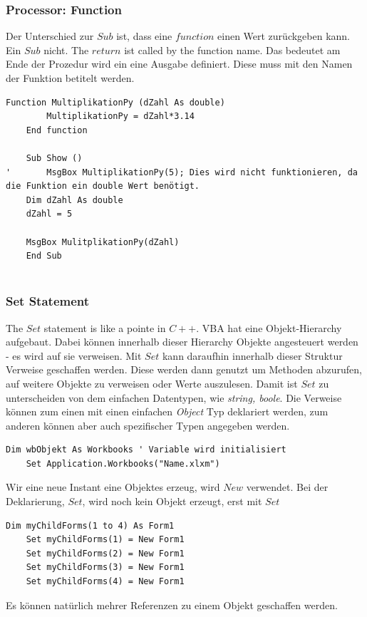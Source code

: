 \subsubsection{Processor: Function}
Der Unterschied zur $Sub$ ist, dass eine $function$ einen Wert zurückgeben kann. Ein $Sub$ nicht.
The $return$ ist called by the function name. Das bedeutet am Ende der Prozedur wird ein eine Ausgabe definiert. Diese muss mit den Namen der Funktion betitelt werden.

\begin{lstlisting}[style=VBA]
	Function MultiplikationPy (dZahl As double)
		MultiplikationPy = dZahl*3.14
	End function
	
	Sub Show ()
' 		MsgBox MultiplikationPy(5); Dies wird nicht funktionieren, da die Funktion ein double Wert benötigt.
	Dim dZahl As double
	dZahl = 5
	
	MsgBox MulitplikationPy(dZahl)
	End Sub
	
\end{lstlisting}


\subsubsection{Set Statement} 
The $Set$ statement is like a pointe in $C++$. \gls{VBA} hat eine Objekt-Hierarchy aufgebaut. Dabei können innerhalb dieser Hierarchy Objekte angesteuert werden - es wird auf sie verweisen. Mit $Set$ kann daraufhin innerhalb dieser Struktur Verweise geschaffen werden. Diese werden dann genutzt um Methoden abzurufen, auf weitere Objekte zu verweisen oder Werte auszulesen. Damit ist $Set$ zu unterscheiden von dem einfachen Datentypen, wie \textit{string, boole}. Die Verweise können zum einen mit einen einfachen \textit{Object} Typ deklariert werden, zum anderen können aber auch spezifischer Typen angegeben werden. 

\begin{lstlisting}[style=VBA]
	Dim wbObjekt As Workbooks ' Variable wird initialisiert
	Set Application.Workbooks("Name.xlxm") 
\end{lstlisting} 
Wir eine neue Instant eine Objektes erzeug, wird $New$ verwendet.
Bei der Deklarierung, $Set$, wird noch kein Objekt erzeugt, erst mit $Set$
\begin{lstlisting}[style=VBA]
	Dim myChildForms(1 to 4) As Form1 
	Set myChildForms(1) = New Form1 
	Set myChildForms(2) = New Form1 
	Set myChildForms(3) = New Form1 
	Set myChildForms(4) = New Form1
\end{lstlisting} 
 Es können natürlich mehrer Referenzen zu einem Objekt geschaffen werden. 

